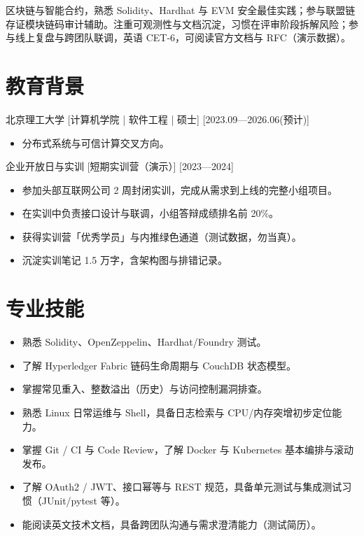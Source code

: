 \documentclass{resume-photo}
\begin{document}

\ResumeTitle

\noindent 区块链与智能合约，熟悉 Solidity、Hardhat 与 EVM 安全最佳实践；参与联盟链存证模块链码审计辅助。注重可观测性与文档沉淀，习惯在评审阶段拆解风险；参与线上复盘与跨团队联调，英语 CET-6，可阅读官方文档与 RFC（演示数据）。

\section{教育背景}
\ResumeItem
{北京理工大学}
[\textnormal{计算机学院 | 软件工程 | 硕士}]
[2023.09—2026.06(预计)]

\begin{itemize}
  \item 分布式系统与可信计算交叉方向。
\end{itemize}


\ResumeItem
{企业开放日与实训}
[\textnormal{短期实训营（演示）}]
[2023—2024]

\begin{itemize}
  \item 参加头部互联网公司 2 周封闭实训，完成从需求到上线的完整小组项目。
  \item 在实训中负责接口设计与联调，小组答辩成绩排名前 20\%。
  \item 获得实训营「优秀学员」与内推绿色通道（测试数据，勿当真）。
  \item 沉淀实训笔记 1.5 万字，含架构图与排错记录。
\end{itemize}



\section{专业技能}
\begin{itemize}
  \item 熟悉 Solidity、OpenZeppelin、Hardhat/Foundry 测试。
  \item 了解 Hyperledger Fabric 链码生命周期与 CouchDB 状态模型。
  \item 掌握常见重入、整数溢出（历史）与访问控制漏洞排查。
  \item 熟悉 Linux 日常运维与 Shell，具备日志检索与 CPU/内存突增初步定位能力。
  \item 掌握 Git / CI 与 Code Review，了解 Docker 与 Kubernetes 基本编排与滚动发布。
  \item 了解 OAuth2 / JWT、接口幂等与 REST 规范，具备单元测试与集成测试习惯（JUnit/pytest 等）。
  \item 能阅读英文技术文档，具备跨团队沟通与需求澄清能力（测试简历）。
\end{itemize}
\end{document}

